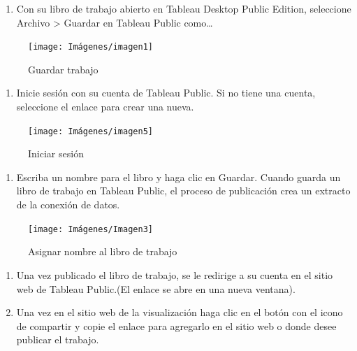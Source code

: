 \documentclass[
]{book}
\providecommand{\tightlist}{%
  \setlength{\itemsep}{0pt}\setlength{\parskip}{0pt}}
\begin{document}
\begin{enumerate}
\def\labelenumi{\arabic{enumi}.}
\tightlist
\item
  Con su libro de trabajo abierto en Tableau Desktop Public Edition, seleccione Archivo \textgreater{} Guardar en Tableau Public como\ldots{}
\end{enumerate}

\begin{figure}

{\centering \texttt{[image: Imágenes/imagen1]} 

}

\caption{Guardar trabajo}\label{fig:guardar1-fig}
\end{figure}

\begin{enumerate}
\def\labelenumi{\arabic{enumi}.}
\setcounter{enumi}{1}
\tightlist
\item
  Inicie sesión con su cuenta de Tableau Public. Si no tiene una cuenta, seleccione el enlace para crear una nueva.
\end{enumerate}

\begin{figure}

{\centering \texttt{[image: Imágenes/imagen5]} 

}

\caption{Iniciar sesión}\label{fig:iniciosesion-fig}
\end{figure}

\begin{enumerate}
\def\labelenumi{\arabic{enumi}.}
\setcounter{enumi}{2}
\tightlist
\item
  Escriba un nombre para el libro y haga clic en Guardar. Cuando guarda un libro de trabajo en Tableau Public, el proceso de publicación crea un extracto de la conexión de datos.
\end{enumerate}

\begin{figure}

{\centering \texttt{[image: Imágenes/Imagen3]} 

}

\caption{Asignar nombre al libro de trabajo}\label{fig:nombrelibro-fig}
\end{figure}

\begin{enumerate}
\def\labelenumi{\arabic{enumi}.}
\setcounter{enumi}{3}
\tightlist
\item
  Una vez publicado el libro de trabajo, se le redirige a su cuenta en el sitio web de Tableau Public.(El enlace se abre en una nueva ventana).
\item
  Una vez en el sitio web de la visualización haga clic en el botón con el icono de compartir y copie el enlace para agregarlo en el sitio web o donde desee publicar el trabajo.
\end{enumerate}
\end{document}
